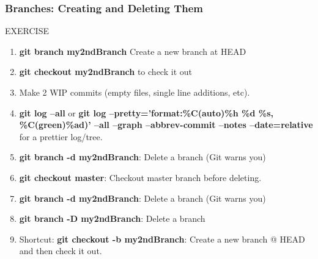 \documentclass{beamer}
\begin{document}
\begin{frame}[fragile]
\frametitle{Branches: Creating and Deleting Them}
	\begin{block}{EXERCISE}
	\begin{enumerate}
		\item \textbf{git branch my2ndBranch } Create a new branch at HEAD
		\item \textbf{git checkout my2ndBranch} to check it out
		\item Make 2 WIP commits (empty files, single line additions, etc).
		\item \textbf{git log --all} or \textbf{git log --pretty='format:\%C(auto)\%h \%d \%s, \%C(green)\%ad)' --all --graph --abbrev-commit --notes --date=relative} for a prettier log/tree.
		\item \textbf{git branch -d my2ndBranch}: Delete a branch (Git warns you)
		\item \textbf{git checkout master}: Checkout master branch before deleting.
		\item \textbf{git branch -d my2ndBranch}: Delete a branch (Git warns you)
		\item \textbf{git branch -D my2ndBranch}: Delete a branch
		\item Shortcut: \textbf{git checkout -b my2ndBranch}: Create a new branch @ HEAD and then check it out.
	\end{enumerate}
\end{block}
\end{frame}
\end{document}

